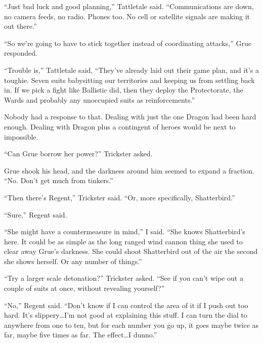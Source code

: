 ``Just bad luck and good planning,'' Tattletale said.  ``Communications are down, no camera feeds, no radio.  Phones too.  No cell or satellite signals are making it out there.''



``So we're going to have to stick together instead of coordinating attacks,'' Grue responded.



``Trouble is,'' Tattletale said, ``They've already laid out their game plan, and it's a toughie.  Seven suits babysitting our territories and keeping us from settling back in.  If we pick a fight like Ballistic did, then they deploy the Protectorate, the Wards and probably any unoccupied suits as reinforcements.''



Nobody had a response to that.  Dealing with just the one Dragon had been hard enough.  Dealing with Dragon plus a contingent of heroes would be next to impossible.



``Can Grue borrow her power?''  Trickster asked.



Grue shook his head, and the darkness around him seemed to expand a fraction.  ``No.  Don't get much from tinkers.''



``Then there's Regent,'' Trickster said.  ``Or, more specifically, Shatterbird.''



``Sure,'' Regent said.



``She might have a countermeasure in mind,'' I said.  ``She knows Shatterbird's here.  It could be as simple as the long ranged wind cannon thing she used to clear away Grue's darkness.  She could shoot Shatterbird out of the air the second she shows herself.  Or any number of things.''



``Try a larger scale detonation?''  Trickster asked.  ``See if you can't wipe out a couple of suits at once, without revealing yourself?''



``No,'' Regent said.  ``Don't know if I can control the area of it if I push out too hard.  It's slippery\ldots I'm not good at explaining this stuff.  I can turn the dial to anywhere from one to ten, but for each number you go up, it goes maybe twice as far, maybe five times as far.  The effect\ldots I dunno.''



